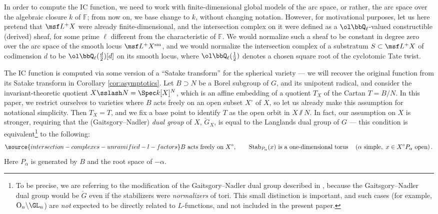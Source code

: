 In order to compute the IC function, we need to work with finite-dimensional global models of the arc space, or rather, the arc space over the algebraic closure $k$ of $\mathbb F$; from now on, we  base change to $k$,  without changing notation. However, for motivational purposes, let us here pretend that $\msf L^+X$ were already finite-dimensional, and the intersection complex on it were defined as a $\ol\bbQ_\ell$-valued constructible (derived) sheaf, for some prime $\ell$ different from the characteristic of $\mathbb F$. We would normalize such a sheaf to be constant in degree zero over the arc space of the smooth locus $\msf L^+X^{\text{sm}}$, and we would normalize the intersection complex of a substratum $S\subset \msf L^+X$ of codimension $d$ to be $\ol\bbQ_\ell(\frac{d}{2})[d]$ on its smooth locus, where $\ol\bbQ_\ell(\frac{1}{2})$ denotes a chosen square root of the cyclotomic Tate twist.

The IC function is computed via some version of a ``Satake transform'' for the spherical variety --- we will recover the original function from its Satake transform in Corollary \ref{cor:asymptotics}. Let $B\supset N$ be a Borel subgroup of $G$, and its unipotent radical, and consider the invariant-theoretic quotient $X\sslash N = \Spec k[X]^N$, which is an affine embedding of a quotient $T_X$ of the Cartan $T=B/N$. In this paper, we restrict ourselves to varieties where $B$ acts freely on an open subset $X^\circ$ of $X$, so let us already make this assumption for notational simplicity. Then $T_X=T$, and we fix a base point to identify $T$ as the open orbit in $X\sslash N$. In fact, our assumption on $X$ is stronger, requiring that the (Gaitsgory--Nadler) \emph{dual group} of $X$, $\check G_X$, is equal to the Langlands dual group of $G$ --- this condition is equivalent\footnote{To be precise, we are referring to the modification of the Gaitsgory--Nadler dual group described in \cite{SV}, because the Gaitsgory--Nadler dual group would be $\check G$ even if the stabilizers were \emph{normalizers} of tori. This small distinction is important, and such cases (for example, $\mathrm{O}_n\backslash \GL_n$) are \emph{not} expected to be directly related to $L$-functions, and not included in the present paper.} to the following:
\begin{equation}
\label{equation-typeT}
\source{intersection-complexes-unramified-l-factors}
B\text{ acts freely on }X^\circ,\qquad
\operatorname{Stab}_{P_\alpha}(x)\text{ is a one-dimensional torus}
\quad
\left(\alpha\text{ simple},\ x\in X^\circ P_\alpha\text{ open}\right).
\end{equation}
Here $P_\alpha$ is generated by $B$ and the root space of $-\alpha$.

